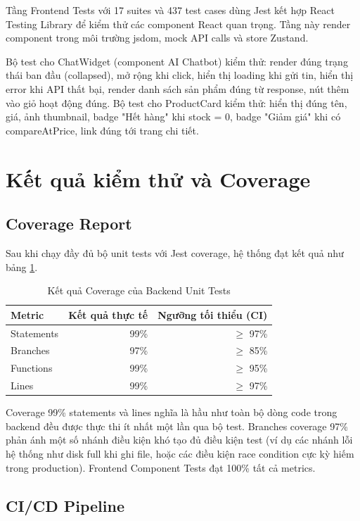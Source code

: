 Tầng Frontend Tests với 17 suites và 437 test cases dùng Jest kết hợp React Testing Library để kiểm thử các component React quan trọng. Tầng này render component trong môi trường jsdom, mock API calls và store Zustand.

Bộ test cho ChatWidget (component AI Chatbot) kiểm thử: render đúng trạng thái ban đầu (collapsed), mở rộng khi click, hiển thị loading khi gửi tin, hiển thị error khi API thất bại, render danh sách sản phẩm đúng từ response, nút thêm vào giỏ hoạt động đúng. Bộ test cho ProductCard kiểm thử: hiển thị đúng tên, giá, ảnh thumbnail, badge "Hết hàng" khi stock = 0, badge "Giảm giá" khi có compareAtPrice, link đúng tới trang chi tiết.

\section{Kết quả kiểm thử và Coverage}

\subsection{Coverage Report}

Sau khi chạy đầy đủ bộ unit tests với Jest coverage, hệ thống đạt kết quả như bảng \ref{tab:coverage-result}.

\begin{table}[H]
\centering
\caption{Kết quả Coverage của Backend Unit Tests}
\label{tab:coverage-result}
\begin{tabular}{|l|r|r|}
\hline
\textbf{Metric} & \textbf{Kết quả thực tế} & \textbf{Ngưỡng tối thiểu (CI)} \\
\hline
Statements & 99\% & $\geq$ 97\% \\
\hline
Branches & 97\% & $\geq$ 85\% \\
\hline
Functions & 99\% & $\geq$ 95\% \\
\hline
Lines & 99\% & $\geq$ 97\% \\
\hline
\end{tabular}
\end{table}

Coverage 99\% statements và lines nghĩa là hầu như toàn bộ dòng code trong backend đều được thực thi ít nhất một lần qua bộ test. Branches coverage 97\% phản ánh một số nhánh điều kiện khó tạo đủ điều kiện test (ví dụ các nhánh lỗi hệ thống như disk full khi ghi file, hoặc các điều kiện race condition cực kỳ hiếm trong production). Frontend Component Tests đạt 100\% tất cả metrics.

\subsection{CI/CD Pipeline}

